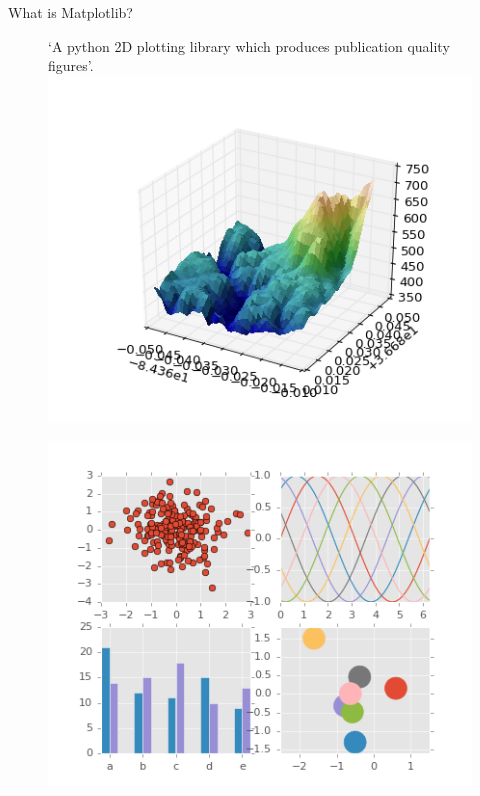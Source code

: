 \documentclass{beamer}
\begin{document}
\begin{frame}{What is Matplotlib?}
	\begin{figure}[t]
		\begin{minipage}[c]{0.45\linewidth}
			\raggedright
			\alert{`A python 2D plotting library which produces publication quality figures'.}\\
			\includegraphics[width=1.1\textwidth]{img/custom_shaded_3d_surface}\\
		\end{minipage}
		\begin{minipage}[c]{0.45\linewidth}
			\centering
			\includegraphics[width=\textwidth]{img/plot-ggplot}\\

\end{minipage}
\end{figure}
\end{frame}
\end{document}
